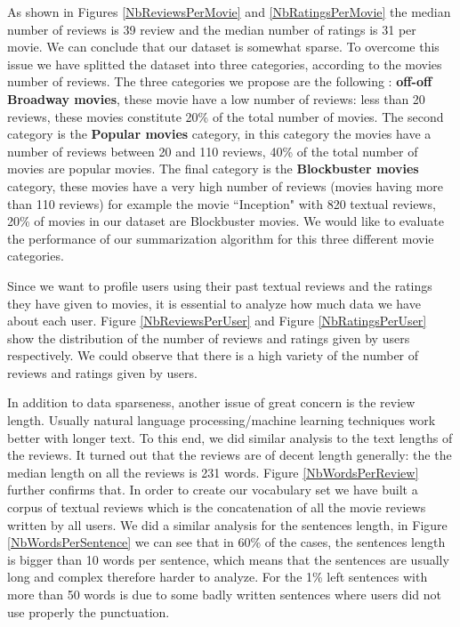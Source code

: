 \documentclass{article}
\begin{document}
As shown in Figures \ref{NbReviewsPerMovie} and \ref{NbRatingsPerMovie} the median number of reviews is 39 review and the median number of ratings is 31 per movie. We can conclude that our dataset is somewhat sparse.
To overcome this issue we have splitted the dataset into three categories, according to the movies number of reviews. The three categories we propose are the following : \textbf{off-off Broadway movies}, these movie have a low number of reviews: less than 20 reviews, these movies constitute 20\% of the total number of movies. The second category is the \textbf{Popular movies} category, in this category the movies have a number of reviews between 20 and 110 reviews, 40\% of the total number of movies are popular movies. The final category is the \textbf{Blockbuster movies} category, these movies have a very high number of reviews (movies having more than 110 reviews) for example the movie ``Inception" with 820 textual reviews,  20\% of movies in our dataset are Blockbuster movies.
We would like to evaluate the performance of our summarization algorithm for this three different movie categories.


Since we want to profile users using their past textual reviews and the ratings they have given to movies, it is essential to analyze how much data we have about each user. Figure \ref{NbReviewsPerUser} and Figure \ref{NbRatingsPerUser} show the distribution of the number of reviews and ratings given by users respectively. We could observe that there is a high variety of the number of reviews and ratings given by users. 

In addition to data sparseness, another issue of great concern is the review length. Usually natural language processing/machine learning techniques work better with longer text. To this end, we did similar analysis to the text lengths of the reviews. It turned out that the reviews are of decent length generally: the the median length on all the reviews is 231 words. Figure \ref{NbWordsPerReview} further confirms that. In order to create our vocabulary set we have built a corpus of textual reviews which is the concatenation of all the movie reviews written by all users.
We did a similar analysis for the sentences length, in Figure \ref{NbWordsPerSentence} we can see that in 60\% of the cases, the sentences length  is bigger than 10 words per sentence, which means that the sentences are usually long and complex therefore harder to analyze. For the 1\% left  sentences with more than 50 words is due to some badly written sentences where users did not use properly the punctuation. 
\end{document}
